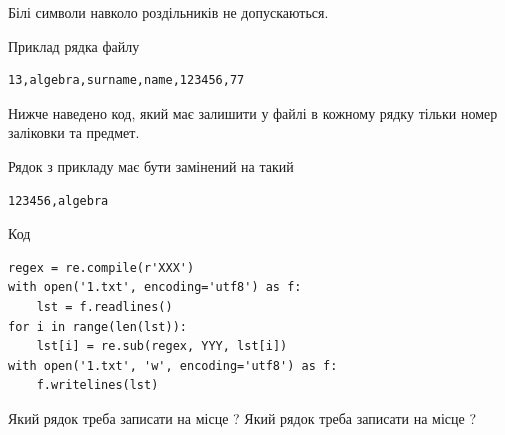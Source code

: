 \documentclass[12pt, ukrainian]{article}
\begin{document}
{Білі символи навколо роздільників не допускаються.

Приклад рядка файлу



\begin{verbatim}
13,algebra,surname,name,123456,77
\end{verbatim}


Нижче наведено код, який має залишити у файлі в кожному рядку тільки номер заліковки та предмет.

Рядок з прикладу має бути замінений на такий



\begin{verbatim}
123456,algebra
\end{verbatim}




Код



\begin{verbatim}
regex = re.compile(r'XXX')
with open('1.txt', encoding='utf8') as f:
    lst = f.readlines()
for i in range(len(lst)):
    lst[i] = re.sub(regex, YYY, lst[i])
with open('1.txt', 'w', encoding='utf8') as f:
    f.writelines(lst)
\end{verbatim}







Який рядок треба записати на місце  ?
Який рядок треба записати на місце  ?\par

}
\newpage
\end{document}
